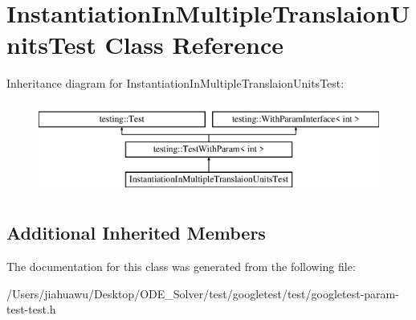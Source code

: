 \hypertarget{class_instantiation_in_multiple_translaion_units_test}{}\section{Instantiation\+In\+Multiple\+Translaion\+Units\+Test Class Reference}
\label{class_instantiation_in_multiple_translaion_units_test}
Inheritance diagram for Instantiation\+In\+Multiple\+Translaion\+Units\+Test\+:\begin{figure}[H]
\begin{center}
\leavevmode
\includegraphics[height=3.000000cm]{class_instantiation_in_multiple_translaion_units_test}
\end{center}
\end{figure}
\subsection*{Additional Inherited Members}


The documentation for this class was generated from the following file\+:\begin{DoxyCompactItemize}
\item 
/\+Users/jiahuawu/\+Desktop/\+O\+D\+E\+\_\+\+Solver/test/googletest/test/googletest-\/param-\/test-\/test.\+h\end{DoxyCompactItemize}
